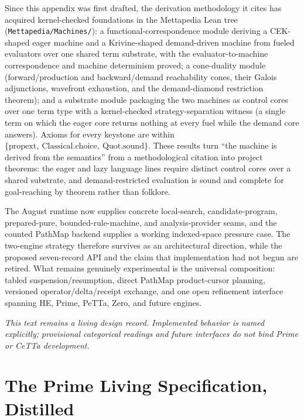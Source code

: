 \documentclass[11pt]{article}
\newcommand{\code}[1]{\texttt{#1}}
\newcommand{\PeTTa}{\textup{PeTTa}}
\newcommand{\CeTTa}{\textup{CeTTa}}
\newcommand{\PathMap}{\textup{PathMap}}
\begin{document}
Since this appendix was first drafted, the derivation methodology it
cites has acquired kernel-checked foundations in the Mettapedia Lean
tree (\code{Mettapedia/Machines/}): a functional-correspondence module
deriving a CEK-shaped eager machine and a Krivine-shaped demand-driven
machine from fueled evaluators over one shared term substrate, with the
evaluator-to-machine correspondence and machine determinism proved; a
cone-duality module (forward/production and backward/demand reachability
cones, their Galois adjunctions, wavefront exhaustion, and the
demand-diamond restriction theorem); and a substrate module packaging
the two machines as control cores over one term type with a
kernel-checked strategy-separation witness (a single term on which the
eager core returns nothing at every fuel while the demand core answers).
Axioms for every keystone are within
$\{\text{propext},\ \text{Classical.choice},\ \text{Quot.sound}\}$.
These results turn ``the machine is derived from the semantics'' from a
methodological citation into project theorems: the eager and lazy
language lines require distinct control cores over a shared substrate,
and demand-restricted evaluation is sound and complete for
goal-reaching by theorem rather than folklore.

The August runtime now supplies concrete local-search, candidate-program,
prepared-pure, bounded-rule-machine, and analysis-provider seams, and the
counted \PathMap{} backend supplies a working indexed-space pressure case.
The two-engine strategy therefore survives as an architectural direction,
while the proposed seven-record API and the claim that implementation had not
begun are retired.  What remains genuinely experimental is the universal
composition: tabled suspension/resumption, direct \PathMap{} product-cursor
planning, versioned operator/delta/receipt exchange, and one open refinement
interface spanning HE, Prime, \PeTTa{}, Zero, and future engines.

\emph{This text remains a living design record.  Implemented behavior is named
explicitly; provisional categorical readings and future interfaces do not
bind Prime or \CeTTa{} development.}


\section{The Prime Living Specification, Distilled}
\label{app:prime-spec}
\end{document}
